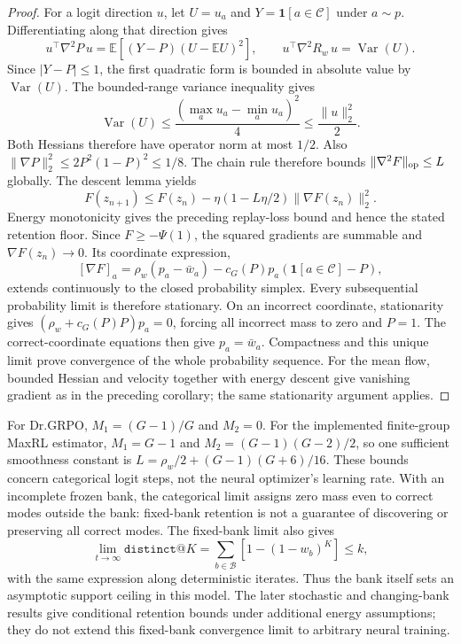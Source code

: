 \begin{proof}
For a logit direction $u$, let $U=u_a$ and $Y=\mathbf1[a\in\mathcal C]$
under $a\sim p$. Differentiating along that direction gives
\[
 u^\top\nabla^2P\,u
 =\mathbb E[(Y-P)(U-\mathbb EU)^2],\qquad
 u^\top\nabla^2R_w\,u=\operatorname{Var}(U).
\]
Since $|Y-P|\le1$, the first quadratic form is bounded in absolute
value by $\operatorname{Var}(U)$. The bounded-range variance inequality gives
\[
 \operatorname{Var}(U)\le\frac{(\max_a u_a-\min_a u_a)^2}{4}
 \le\frac{\lVert u\rVert_2^2}{2}.
\]
Both Hessians therefore have operator norm at most $1/2$.
Also $\lVert\nabla P\rVert_2^2\le2P^2(1-P)^2\le1/8$.
The chain rule therefore bounds $\lVert\nabla^2F\rVert_{\rm op}\le L$
globally. The descent lemma yields
\[
 F(z_{n+1})\le F(z_n)
 -\eta(1-L\eta/2)\lVert\nabla F(z_n)\rVert_2^2.
\]
Energy monotonicity gives the preceding replay-loss bound and hence the
stated retention floor. Since $F\ge-\Psi(1)$, the squared gradients are
summable and $\nabla F(z_n)\to0$. Its coordinate expression,
\[
 [\nabla F]_a=\rho_w(p_a-\bar w_a)
 -c_G(P)p_a(\mathbf1[a\in\mathcal C]-P),
\]
extends continuously to the closed probability simplex. Every subsequential
probability limit is therefore stationary. On an incorrect coordinate,
stationarity gives $(\rho_w+c_G(P)P)p_a=0$, forcing all incorrect mass to
zero and $P=1$. The correct-coordinate equations then give $p_a=\bar w_a$.
Compactness and this unique limit prove convergence of the whole probability
sequence. For the mean flow, bounded Hessian and velocity together with
energy descent give vanishing gradient as in the preceding corollary;
the same stationarity argument applies.
\end{proof}

For Dr.GRPO, $M_1=(G-1)/G$ and $M_2=0$. For the implemented finite-group
MaxRL estimator, $M_1=G-1$ and $M_2=(G-1)(G-2)/2$, so one sufficient smoothness
constant is $L=\rho_w/2+(G-1)(G+6)/16$. These bounds concern categorical logit
steps, not the neural optimizer's learning rate. With an incomplete frozen
bank, the categorical limit assigns zero mass even to correct modes outside
the bank: fixed-bank retention is not a guarantee of discovering or preserving
all correct modes. The fixed-bank limit also gives
\[
 \lim_{t\to\infty}\texttt{distinct@}K
 =\sum_{b\in\mathcal B}[1-(1-w_b)^K]\le k,
\]
with the same expression along deterministic iterates. Thus the bank itself
sets an asymptotic support ceiling in this model. The later stochastic and changing-bank results give conditional
retention bounds under additional energy assumptions; they do not extend this
fixed-bank convergence limit to arbitrary neural training.

